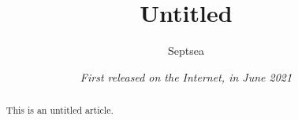 \documentclass[UTF8,fontset=none,twoside,leqno,a4paper]{ctexart}
\newcommand{\newsection}{\cleardoublepage \thispagestyle{empty}}
\begin{document}

\title{\sffamily Untitled}
\date{\sffamily \itshape First released on the Internet, in June 2021}
\author{\sffamily Septsea}
\pagestyle{plain}
\renewcommand{\contentsname}{Table of Contents}
\renewcommand{\abstractname}{Abstract}

\maketitle
\thispagestyle{empty}
\begin{abstract}
    This is an untitled article.
\end{abstract}
\tableofcontents


\newsection


\newsection
\pagestyle{headings}
\setcounter{page}{1}


\cleardoublepage
\thispagestyle{empty}
\end{document}
